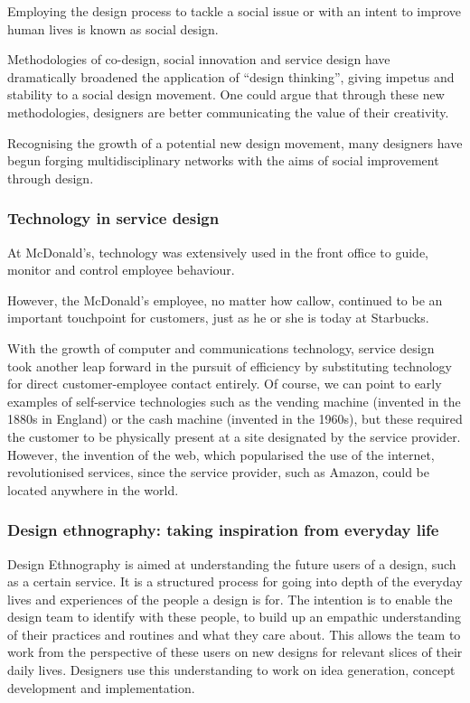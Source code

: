 Employing the design process to tackle a social issue or with an intent to improve human lives is known as social design.

Methodologies of co-design, social innovation and service design have dramatically broadened the application of “design thinking”, giving impetus and stability to a social design movement. One could argue that through these new methodologies, designers are better communicating the value of their creativity.

Recognising the growth of a potential new design movement, many designers have begun forging multidisciplinary networks with the aims of social improvement through design.

\subsubsection{Technology in service design}
At McDonald’s, technology was extensively used in the front office to guide, monitor and control employee behaviour.

However, the McDonald’s employee, no matter how callow, continued to be an important touchpoint for customers, just as he or she is today at Starbucks.

With the growth of computer and communications technology, service design took another leap forward in the pursuit of efficiency by substituting technology for direct customer-employee contact entirely. Of course, we can point to early examples of self-service technologies such as the vending machine (invented in the 1880s in England) or the cash machine (invented in the 1960s), but these required the customer to be physically present at a site designated by the service provider. However, the invention of the web, which popularised the use of the internet, revolutionised services, since the service provider, such as Amazon, could be located anywhere in the world.

\subsubsection{Design ethnography: taking inspiration from everyday life}
Design Ethnography is aimed at understanding the future users of a design, such as a certain service. It is a structured process for going into depth of the everyday lives and experiences of the people a design is for. The intention is to enable the design team to identify with these people, to build up an empathic understanding of their practices and routines and what they care about. This allows the team to work from the perspective of these users on new designs for relevant slices of their daily lives. Designers use this understanding to work on idea generation, concept development and implementation.

